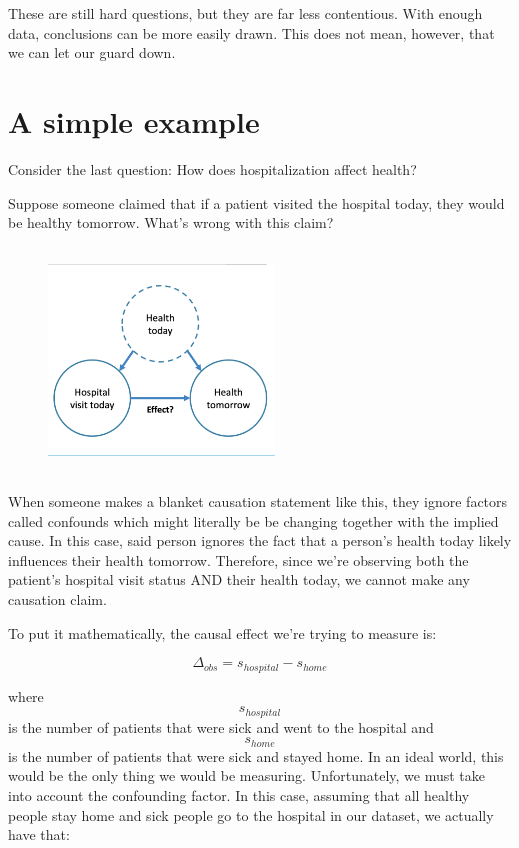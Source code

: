 These are still hard questions, but they are far less contentious. With enough data, conclusions can be more easily drawn. This does not mean, however, that we can let our guard down.

\section{A simple example}

Consider the last question: How does hospitalization affect health?

Suppose someone claimed that if a patient visited the hospital today, they would be healthy tomorrow. What's wrong with this claim?

\begin{figure}[H]
\includegraphics[width=6cm, height=6cm]{img/health.png}
\centering
\end{figure}

When someone makes a blanket causation statement like this, they ignore factors called confounds which might literally be be changing together with the implied cause. In this case, said person ignores the fact that a person's health today likely influences their health tomorrow. Therefore, since we're observing both the patient's hospital visit status AND their health today, we cannot make any causation claim.

To put it mathematically, the causal effect we're trying to measure is:

\[\Delta_{obs} = s_{hospital} - s_{home}\]

where $$s_{hospital}$$ is the number of patients that were sick and went to the hospital and $$s_{home}$$ is the number of patients that were sick and stayed home. In an ideal world, this would be the only thing we would be measuring. Unfortunately, we must take into account the confounding factor. In this case, assuming that all healthy people stay home and sick people go to the hospital in our dataset, we actually have that:

